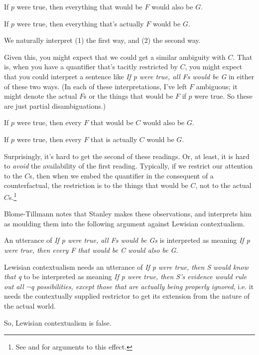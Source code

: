 \begin{itemize*}
\item If $p$ were true, then everything that would be $F$ would also be $G$.
\item If $p$ were true, then everything that's actually $F$ would be $G$.
\end{itemize*}

\noindent We naturally interpret (1) the first way, and (2) the second way.


\noindent Given this, you might expect that we could get a similar ambiguity with $C$. That is, when you have a quantifier that's tacitly restricted by $C$, you might expect that you could interpret a sentence like \textit{If p were true, all Fs would be G} in either of these two ways. (In each of these interpretations, I've left $F$ ambiguous; it might denote the actual \(F\)s or the things that would be \(F\) if \(p\) were true. So these are just partial disambiguations.)

\begin{itemize*}
\item If $p$ were true, then every $F$ that would be $C$ would also be $G$.
\item If $p$ were true, then every $F$ that is actually $C$ would be $G$.
\end{itemize*}

\noindent Surprisingly, it's hard to get the second of these readings. Or, at least, it is hard to \textit{avoid} the availability of the first reading. Typically, if we restrict our attention to the $C$s, then when we embed the quantifier in the consequent of a counterfactual, the restriction is to the things that would be $C$, not to the actual $C$s.\footnote{See \cite{Stanley2000-STAOQD} and \cite{Stanley2005-STAKAP} for arguments to this effect.} 

Blome-Tillmann notes that Stanley makes these observations, and interprets him as moulding them into the following argument against Lewisian contextualism.

\begin{enumerate*}
\item An utterance of \textit{If p were true, all Fs would be Gs} is interpreted as meaning \textit{If p were true, then every F that would be C would also be G}.
\item Lewisian contextualism needs an utterance of \textit{If p were true, then S would know that q} to be interpreted as meaning \textit{If p were true, then S's evidence would rule out all $\neg$q possibilities, except those that are actually being properly ignored}, i.e. it needs the contextually supplied restrictor to get its extension from the nature of the actual world.
\item So, Lewisian contextualism is false.
\end{enumerate*}

